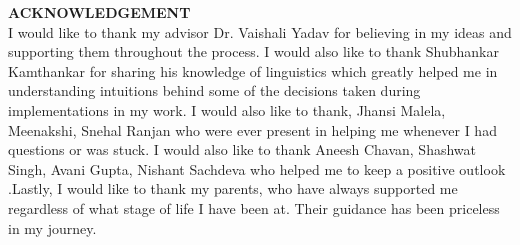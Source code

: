 \documentclass[letterpaper,12pt]{article}
\begin{document}
\pagebreak


%

\pagebreak 
\begin{center}

 
    
    \Large \textbf{ACKNOWLEDGEMENT}\\[0.5 in]
    
\large{I would like to thank my  advisor Dr. Vaishali Yadav for believing in my ideas and supporting them throughout the process. I would also like to thank Shubhankar Kamthankar for sharing his knowledge of linguistics which greatly helped me in understanding intuitions behind some of the decisions taken during implementations in my work. I would also like to thank, Jhansi Malela, Meenakshi, Snehal Ranjan who were ever present in helping me whenever I had questions or was stuck. I would also like to thank Aneesh Chavan, Shashwat Singh, Avani Gupta, Nishant Sachdeva who helped me to keep a positive outlook .Lastly, I would like to thank my parents, who have always supported me regardless of what stage of life I have been at. Their guidance has been priceless in my journey.}
\\[1 in]

\end{center}


\pagebreak
\end{document}
